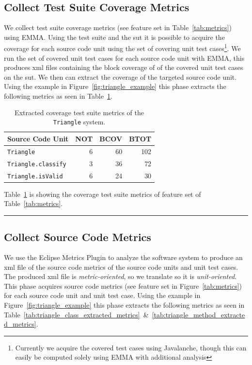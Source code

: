 \subsection{Collect Test Suite Coverage Metrics}
\label{subsec:approach_collect_coverage_metrics}
We collect test suite coverage metrics (see feature set  in Table~\ref{tab:metrics}) using EMMA. Using the test suite and the \gls{sut} it is possible to acquire the coverage for each source code unit using the set of covering unit test cases\footnote{Currently we acquire the covered test cases using Javalanche, though this can easily be computed solely using EMMA with additional analysis}. We run the set of covered unit test cases for each source code unit with EMMA, this produces \gls{xml} files containing the block coverage of of the covered unit test cases on the \gls{sut}. We then can extract the coverage of the targeted source code unit. Using the example in Figure~\ref{fig:triangle_example} this phase extracts the following metrics as seen in Table~\ref{tab:triangle_coverage_metrics}.

\begin{table}[h]
  \centering
  \begin{tabular}{|l|r|r|r|}
    \hline
    \rowcolor[RGB]{169,196,223}
    \textbf{Source Code Unit} & \textbf{NOT} & \textbf{BCOV} & \textbf{BTOT} \\
    \hline \texttt{Triangle} & 6 & 60 & 102 \\
    \hline \texttt{Triangle.classify} & 3 & 36 & 72 \\
    \hline \texttt{Triangle.isValid} & 6 & 24 & 30 \\
    \hline
  \end{tabular}
  \caption{Extracted coverage test suite metrics of the \texttt{Triangle} system.}
  \vspace{1mm}
  \footnotesize{Table~\ref{tab:triangle_coverage_metrics} is showing the coverage test suite metrics of feature set  of Table~\ref{tab:metrics}.}
  \vspace{2mm}
  \hrule
  \label{tab:triangle_coverage_metrics}
\end{table}


\subsection{Collect Source Code Metrics}
\label{subsec:approach_collect_source_metrics}
We use the Eclipse Metrics Plugin to analyze the software system to produce an \gls{xml} file of the source code metrics of the source code units and unit test cases. The produced \gls{xml} file is \emph{metric-oriented}, so we translate so it is \emph{unit-oriented}. This phase acquires source code metrics (see feature set  in Figure~\ref{tab:metrics}) for each source code unit and unit test case. Using the example in Figure~\ref{fig:triangle_example} this phase extracts the following metrics as seen in Table~\ref{tab:triangle_class_extracted_metrics}~\&~\ref{tab:triangle_method_extracted_metrics}.

